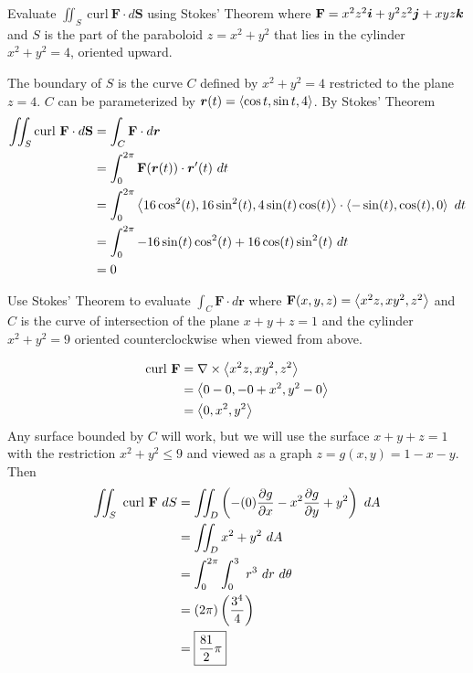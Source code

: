 \documentclass[12pt]{exam}
\newcommand{\mbf}{\mathbf{F}}
\begin{document}
\begin{questions}
\begin{solution}
    \end{solution}
    \else
        \vfill
    \fi

\newpage 
\question Evaluate \(\iint_S~\mathrm{curl}~\mbf\cdot d\mathbf{S}\) using Stokes' Theorem where 
        \(\mbf=x^2z^2\bi+y^2z^2\bj+xyz\bk\) and \(S\) is the part of the paraboloid \(z=x^2+y^2\) that lies in the cylinder
        \(x^2+y^2=4\), oriented upward.
    \ifprintanswers
        \begin{solution}
            The boundary of \(S\) is the curve \(C\) defined by \(x^2+y^2=4\) restricted to the plane \(z=4\). \(C\) can be parameterized by 
            \(\bm{r}(t)=\left\langle \cos t,\sin t,4 \right\rangle\).
            By Stokes' Theorem
        \begin{align*}
        \iint_S \mathrm{curl}~\mathbf{F}\cdot d\mathbf{S} 
            & = \int_{C}\mathbf{F}\cdot d\bm{r}\\
            & = \int_0^{2\pi}\mbf(\bm{r}(t))\cdot \bm{r}'(t)~dt\\
            & = \int_0^{2\pi}\gen{16\cos^2(t),16\sin^2(t),4\sin(t)\cos(t)}\cdot \gen{-\sin(t),\cos(t),0}~dt\\
            & = \int_0^{2\pi}-16\sin(t)\cos^2(t)+16\cos(t)\sin^2(t)~dt\\
            & = 0
        \end{align*}
        \end{solution}
    \else
        \vfill
    \fi








\question Use Stokes' Theorem to evaluate 
\(\int_C\mathbf{F}\cdot d\bm{r}\) where \(\mbf(x,y,z)=\gen{x^2z,xy^2,z^2}\) and \(C\) is the 
curve of intersection of the plane \(x+y+z=1\) and the cylinder \(x^2+y^2=9\) oriented counterclockwise when viewed from above.
    \ifprintanswers
        \begin{solution}
            \begin{align*}
                \mathrm{curl}~\mbf & = \nabla\times\gen{x^2z,xy^2,z^2}\\
                    & = \gen{0-0,-0+x^2,y^2-0}\\
                    & = \gen{0,x^2,y^2}
            \end{align*}
            Any surface bounded by \(C\) will work, but we will use the surface \(x+y+z=1\) with the restriction \(x^2+y^2\le 9\) and viewed as a graph \(z=g(x,y)=1-x-y.\)
            Then 
            \begin{align*}
                \iint_{S}~\text{curl}~\mbf~dS & = \iint_D \left( -(0)\pd{g}{x}-x^2\pd{g}{y}+y^2 \right)~dA\\
                    & = \iint_D x^2+y^2~dA\\
                    & = \int_{0}^{2\pi}\int_0^3~r^3~dr~d\theta\\
                    & =  (2\pi)\left(\frac{3^4}{4}\right)\\
                    & = \boxed{\frac{81}{2}\pi}
            \end{align*}
        \end{solution}
    \else
        \vfill
    \fi


\end{questions}
\end{document}
